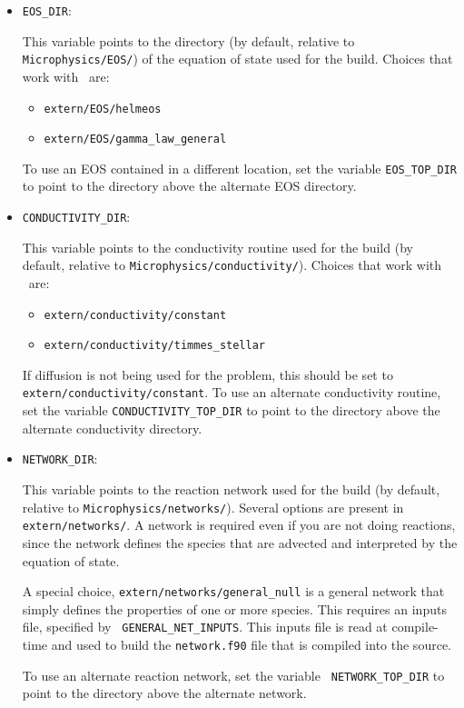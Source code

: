 \begin{itemize}
\item {\tt EOS\_DIR}:

  This variable points to the directory (by default, relative to {\tt Microphysics/EOS/}) of
  the equation of state used for the build.  Choices that work
  with \maestro\ are:
  \begin{itemize}
  \item {\tt extern/EOS/helmeos}
  \item {\tt extern/EOS/gamma\_law\_general}
  \end{itemize}
  To use an EOS contained in a different location, set the variable {\tt EOS\_TOP\_DIR}
  to point to the directory above the alternate EOS directory.

\item {\tt CONDUCTIVITY\_DIR}:

  This variable points to the conductivity routine used for the build
  (by default, relative to {\tt Microphysics/conductivity/}).  Choices
  that work with \maestro\ are: 
  \begin{itemize} 
  \item {\tt extern/conductivity/constant} 
  \item {\tt extern/conductivity/timmes\_stellar} 
  \end{itemize} 
  If diffusion is not being used for the problem, this should be set
  to {\tt extern/conductivity/constant}.  To use an alternate conductivity
  routine, set the variable {\tt CONDUCTIVITY\_TOP\_DIR} to point
  to the directory above the alternate conductivity directory.

\item {\tt NETWORK\_DIR}:

  This variable points to the reaction network used for the build (by
  default, relative to {\tt Microphysics/networks/}).  Several options
  are present in {\tt extern/networks/}.  A network is required even
  if you are not doing reactions, since the network defines the
  species that are advected and interpreted by the equation of state.

  A special choice, {\tt extern/networks/general\_null} is a general
  network that simply defines the properties of one or more species.
  This requires an inputs file, specified by {\tt
  GENERAL\_NET\_INPUTS}.  This inputs file is read at compile-time and
  used to build the {\tt network.f90} file that is compiled into the
  source.

  To use an alternate reaction network, set the variable {\tt
  NETWORK\_TOP\_DIR} to point to the directory above the alternate
  network.

\end{itemize}


